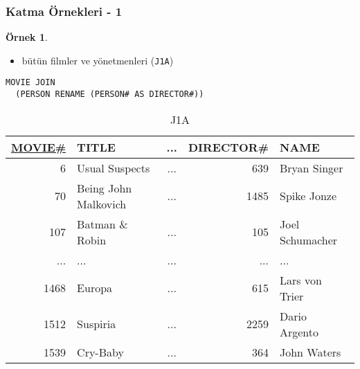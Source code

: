 \documentclass[dvipsnames]{beamer}
\theoremstyle{definition}
\theoremstyle{example}
\newtheorem{ornek}[theorem]{Örnek}
\theoremstyle{plain}
\begin{document}
\begin{frame}[fragile]
  \frametitle{Katma Örnekleri - 1}

  \begin{ornek}
    \begin{itemize}
      \item bütün filmler ve yönetmenleri (\texttt{J1A})
    \end{itemize}

    \begin{lstlisting}
MOVIE JOIN
  (PERSON RENAME (PERSON# AS DIRECTOR#))
    \end{lstlisting}

    \pause
    \vspace{-10pt}
    \begin{tiny}
    \begin{table}
      \caption{J1A}
      \begin{tabular}{|r|l|c|r|l|}\hline
\underline{MOVIE\#} & TITLE & ... & DIRECTOR\# & NAME            \\[2pt]\hline\hline
   6 & Usual Suspects       & ... &     639  & Bryan Singer    \\\hline
  70 & Being John Malkovich & ... &      1485  & Spike Jonze     \\\hline
 107 & Batman \& Robin      & ... &       105  & Joel Schumacher \\\hline
 ... & ...                  & ... &       ...  & ...             \\\hline
1468 & Europa               & ... &       615  & Lars von Trier  \\\hline
1512 & Suspiria             & ... &      2259  & Dario Argento   \\\hline
1539 & Cry-Baby             & ... &       364  & John Waters     \\\hline
      \end{tabular}
    \end{table}
    \end{tiny}
  \end{ornek}
\end{frame}
\end{document}
